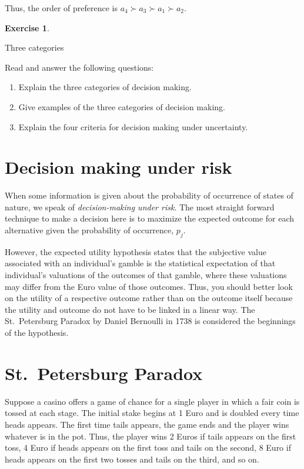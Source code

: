 \documentclass[
  12pt,
  oneside]{book}
\providecommand{\tightlist}{%
  \setlength{\itemsep}{0pt}\setlength{\parskip}{0pt}}
\theoremstyle{definition}
\theoremstyle{definition}
\theoremstyle{definition}
\newtheorem{exercise}{Exercise}[chapter]
\theoremstyle{definition}
\theoremstyle{remark}
\begin{document}
Thus, the order of preference is \(a_4\succ a_3 \succ a_1 \succ a_2\).

\begin{exercise}
\protect\hypertarget{exr:finne}{}\label{exr:finne}

Three categories

Read \citet{Finne1998three} and answer the following questions:

\begin{enumerate}
\def\labelenumi{\alph{enumi})}
\tightlist
\item
  Explain the three categories of decision making.
\item
  Give examples of the three categories of decision making.
\item
  Explain the four criteria for decision making under uncertainty.
\end{enumerate}

\end{exercise}

\hypertarget{decision-making-under-risk}{%
\section{Decision making under risk}\label{decision-making-under-risk}}

When some information is given about the probability of occurrence of states of nature, we speak of \emph{decision-making under risk}. The most straight forward technique to make a decision here is to maximize the expected outcome for each alternative given the probability of occurrence, \(p_j\).

However, the expected utility hypothesis states that the subjective value associated with an individual's gamble is the statistical expectation of that individual's valuations of the outcomes of that gamble, where these valuations may differ from the Euro value of those outcomes. Thus, you should better look on the utility of a respective outcome rather than on the outcome itself because the utility and outcome do not have to be linked in a linear way. The St.~Petersburg Paradox by Daniel Bernoulli in 1738 is considered the beginnings of the hypothesis.

\hypertarget{st.-petersburg-paradox}{%
\section*{St.~Petersburg Paradox}\label{st.-petersburg-paradox}}

Suppose a casino offers a game of chance for a single player in which a fair coin is tossed at each stage. The initial stake begins at 1 Euro and is doubled every time heads appears. The first time tails appears, the game ends and the player wins whatever is in the pot. Thus, the player wins 2 Euros if tails appears on the first toss, 4 Euro if heads appears on the first toss and tails on the second, 8 Euro if heads appears on the first two tosses and tails on the third, and so on.
\end{document}
